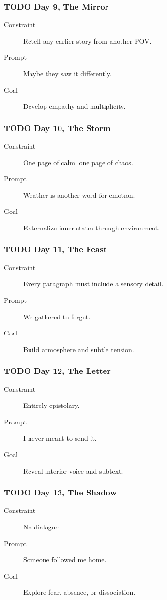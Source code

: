 \documentclass[11pt]{article}
\begin{document}
\subsubsection*{{\bfseries\sffamily TODO} Day 9, The Mirror}
\label{sec:org4e3f4c7}
\begin{description}
\item[{Constraint}] Retell any earlier story from another POV.
\item[{Prompt}] Maybe they saw it differently.
\item[{Goal}] Develop empathy and multiplicity.
\end{description}
\subsubsection*{{\bfseries\sffamily TODO} Day 10, The Storm}
\label{sec:orge7a8ca4}
\begin{description}
\item[{Constraint}] One page of calm, one page of chaos.
\item[{Prompt}] Weather is another word for emotion.
\item[{Goal}] Externalize inner states through environment.
\end{description}
\subsubsection*{{\bfseries\sffamily TODO} Day 11, The Feast}
\label{sec:orgfb5a5eb}
\begin{description}
\item[{Constraint}] Every paragraph must include a sensory detail.
\item[{Prompt}] We gathered to forget.
\item[{Goal}] Build atmosphere and subtle tension.
\end{description}
\subsubsection*{{\bfseries\sffamily TODO} Day 12, The Letter}
\label{sec:orgbf90f92}
\begin{description}
\item[{Constraint}] Entirely epistolary.
\item[{Prompt}] I never meant to send it.
\item[{Goal}] Reveal interior voice and subtext.
\end{description}
\subsubsection*{{\bfseries\sffamily TODO} Day 13, The Shadow}
\label{sec:org89367c5}
\begin{description}
\item[{Constraint}] No dialogue.
\item[{Prompt}] Someone followed me home.
\item[{Goal}] Explore fear, absence, or dissociation.
\end{description}
\end{document}
